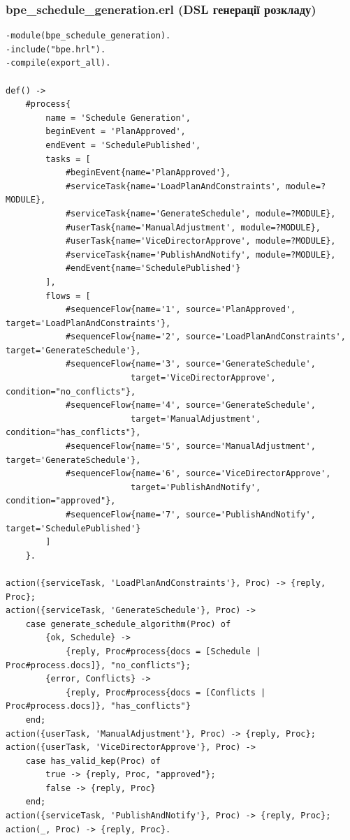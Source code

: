 \documentclass{article}
\begin{document}
\subsubsection{bpe\_schedule\_generation.erl (DSL генерації розкладу)}
\begin{verbatim}
-module(bpe_schedule_generation).
-include("bpe.hrl").
-compile(export_all).

def() ->
    #process{
        name = 'Schedule Generation',
        beginEvent = 'PlanApproved',
        endEvent = 'SchedulePublished',
        tasks = [
            #beginEvent{name='PlanApproved'},
            #serviceTask{name='LoadPlanAndConstraints', module=?MODULE},
            #serviceTask{name='GenerateSchedule', module=?MODULE},
            #userTask{name='ManualAdjustment', module=?MODULE},
            #userTask{name='ViceDirectorApprove', module=?MODULE},
            #serviceTask{name='PublishAndNotify', module=?MODULE},
            #endEvent{name='SchedulePublished'}
        ],
        flows = [
            #sequenceFlow{name='1', source='PlanApproved', target='LoadPlanAndConstraints'},
            #sequenceFlow{name='2', source='LoadPlanAndConstraints', target='GenerateSchedule'},
            #sequenceFlow{name='3', source='GenerateSchedule', 
                         target='ViceDirectorApprove', condition="no_conflicts"},
            #sequenceFlow{name='4', source='GenerateSchedule', 
                         target='ManualAdjustment', condition="has_conflicts"},
            #sequenceFlow{name='5', source='ManualAdjustment', target='GenerateSchedule'},
            #sequenceFlow{name='6', source='ViceDirectorApprove', 
                         target='PublishAndNotify', condition="approved"},
            #sequenceFlow{name='7', source='PublishAndNotify', target='SchedulePublished'}
        ]
    }.

action({serviceTask, 'LoadPlanAndConstraints'}, Proc) -> {reply, Proc};
action({serviceTask, 'GenerateSchedule'}, Proc) ->
    case generate_schedule_algorithm(Proc) of
        {ok, Schedule} -> 
            {reply, Proc#process{docs = [Schedule | Proc#process.docs]}, "no_conflicts"};
        {error, Conflicts} -> 
            {reply, Proc#process{docs = [Conflicts | Proc#process.docs]}, "has_conflicts"}
    end;
action({userTask, 'ManualAdjustment'}, Proc) -> {reply, Proc};
action({userTask, 'ViceDirectorApprove'}, Proc) ->
    case has_valid_kep(Proc) of
        true -> {reply, Proc, "approved"};
        false -> {reply, Proc}
    end;
action({serviceTask, 'PublishAndNotify'}, Proc) -> {reply, Proc};
action(_, Proc) -> {reply, Proc}.
\end{verbatim}
\end{document}
